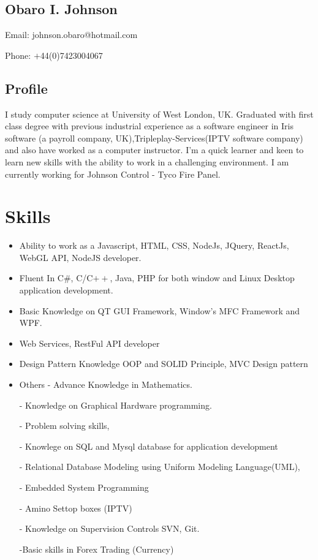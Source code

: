 \documentclass[11px]{article}
\begin{document}
	\begin{center}
	\section*{Obaro I. Johnson}
	Email: johnson.obaro@hotmail.com
	
    Phone: $+$44(0)7423004067
    \end{center}
   \makebox[\linewidth]{\rule{\paperwidth}{0.1pt}}
	
	\subsection*{Profile}
	I study computer science at University of West London, UK. Graduated with first class degree with previous industrial experience as a software engineer in   Iris software  (a payroll company, UK),Tripleplay-Services(IPTV software company) and also have worked as a computer instructor. I'm a quick learner and keen to learn new skills with the ability to work in a challenging environment.  I am currently working for Johnson Control - Tyco Fire Panel. 
	
	
\section*{Skills}
 \begin{itemize}
 	\item Ability to work as a Javascript, HTML, CSS, NodeJs, JQuery, ReactJs,  WebGL API, NodeJS developer.
 	 
 	\item Fluent In C\#,  C/C$++$, Java, PHP for both window and Linux Desktop application development.
 	\item Basic Knowledge on QT GUI Framework, Window's MFC Framework and WPF.
 	
 	\item Web Services, RestFul API developer
 	   
 	\item Design Pattern
 	     Knowledge OOP and SOLID Principle, 	     
 	     MVC Design pattern
 	\item Others 	
 	  - Advance Knowledge in Mathematics.
 	  
 	  - Knowledge on Graphical Hardware programming.
 	  
 	  - Problem solving skills,
 	  
 	  - Knowlege on SQL and  Mysql  database for application development
 	  
 	  - Relational Database Modeling using Uniform Modeling Language(UML),
 	 
 	  - Embedded System Programming 
 	 
	 	 -  Amino Settop boxes (IPTV)
	 	 
	 	 - Knowledge on Supervision Controls SVN, Git.
	 	 
	 -Basic skills in Forex Trading (Currency) 
 	 	  
 \end{itemize}
 \hrulefill
 
\end{document}
